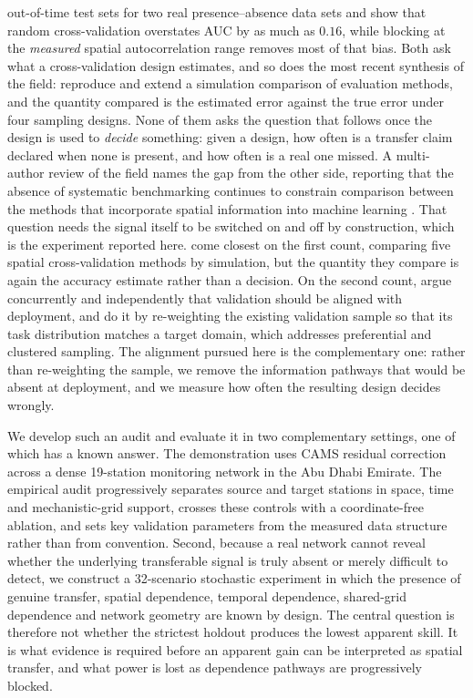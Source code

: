 out-of-time test sets for two real presence--absence data sets and show that random cross-validation overstates AUC by as much as $0.16$, while blocking at the \emph{measured} spatial autocorrelation range removes most of that bias. Both ask what a cross-validation design estimates, and so does the most recent synthesis of the field: \citet{linnenbrink2026beyond} reproduce and extend a simulation comparison of evaluation methods, and the quantity compared is the estimated error against the true error under four sampling designs. None of them asks the question that follows once the design is used to \emph{decide} something: given a design, how often is a transfer claim declared when none is present, and how often is a real one missed. A multi-author review of the field names the gap from the other side, reporting that the absence of systematic benchmarking continues to constrain comparison between the methods that incorporate spatial information into machine learning \citep{nowosad2026navigating}. That question needs the signal itself to be switched on and off by construction, which is the experiment reported here. \citet{mahoney2023assessing} come closest on the first count, comparing five spatial cross-validation methods by simulation, but the quantity they compare is again the accuracy estimate rather than a decision. On the second count, \citet{brenning2026aligning} argue concurrently and independently that validation should be aligned with deployment, and do it by re-weighting the existing validation sample so that its task distribution matches a target domain, which addresses preferential and clustered sampling. The alignment pursued here is the complementary one: rather than re-weighting the sample, we remove the information pathways that would be absent at deployment, and we measure how often the resulting design decides wrongly.

We develop such an audit and evaluate it in two complementary settings, one of which has a known answer. The demonstration uses CAMS \pmten{} residual correction across a dense 19-station monitoring network in the Abu Dhabi Emirate. The empirical audit progressively separates source and target stations in space, time and mechanistic-grid support, crosses these controls with a coordinate-free ablation, and sets key validation parameters from the measured data structure rather than from convention. Second, because a real network cannot reveal whether the underlying transferable signal is truly absent or merely difficult to detect, we construct a 32-scenario stochastic experiment in which the presence of genuine transfer, spatial dependence, temporal dependence, shared-grid dependence and network geometry are known by design. The central question is therefore not whether the strictest holdout produces the lowest apparent skill. It is what evidence is required before an apparent gain can be interpreted as spatial transfer, and what power is lost as dependence pathways are progressively blocked.

